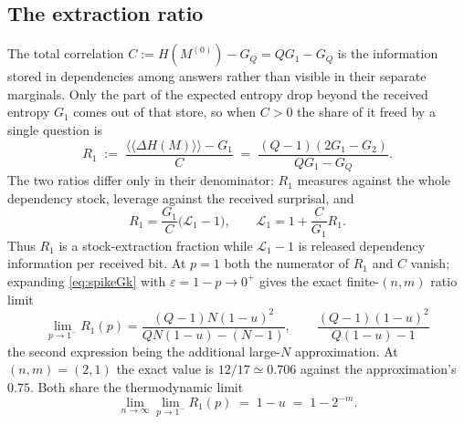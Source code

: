 \documentclass[11pt]{article}
\begin{document}
\subsection{The extraction ratio}

The total correlation $C := H(M^{(0)}) - G_Q = Q G_1 - G_Q$ is the
information stored in dependencies among answers rather than visible
in their separate marginals. Only the part of the expected entropy
drop beyond the received entropy $G_1$ comes out of that store, so
when $C > 0$ the share of it freed by a single question is
%
\begin{equation}
  R_1 \;:=\; \frac{\langle\!\langle \Delta H(M)\rangle\!\rangle - G_1}{C}
  \;=\; \frac{(Q-1)(2G_1 - G_2)}{Q G_1 - G_Q}. 
  \label{eq:extraction}
\end{equation}
%
The two ratios differ only in their denominator:
$R_1$ measures against the whole dependency stock, leverage against
the received surprisal, and
%
\begin{equation}
  R_1 = \frac{G_1}{C}\big(\mathcal L_1 - 1\big),
  \qquad
  \mathcal L_1 = 1 + \frac{C}{G_1}R_1 .
  \label{eq:extractionvslev}
\end{equation}
%
Thus $R_1$ is a stock-extraction fraction while
$\mathcal L_1 - 1$ is released dependency information per
received bit. At $p = 1$ both the numerator of $R_1$ and $C$ vanish;
expanding \eqref{eq:spikeGk} with $\varepsilon = 1 - p \to 0^+$ gives
the exact finite-$(n,m)$ ratio limit
%
\begin{equation}
  \lim_{p\to1^-}R_1(p)
  = \frac{(Q-1)N(1-u)^2}{Q N(1-u) - (N-1)}, 
  \qquad
  \frac{(Q-1)(1-u)^2}{Q(1-u)-1}
  \label{eq:extractionsharp}
\end{equation}
%
the second expression being the additional large-$N$ approximation.
At $(n,m) = (2,1)$ the exact value is $12/17 \simeq 0.706$ against
the approximation's $0.75$. Both share the thermodynamic limit
%
\begin{equation}
  \lim_{n\to\infty}\lim_{p\to1^-}R_1(p) \;=\; 1 - u \;=\; 1 - 2^{-m}. 
  \label{eq:extractiontdl}
\end{equation}
\end{document}
